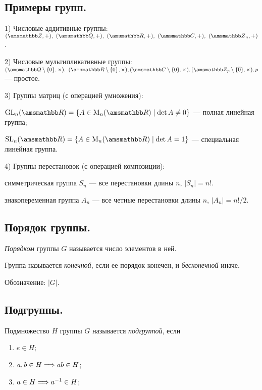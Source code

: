 \vspace{-0.2cm}
\subsection{Примеры групп.}
1) Числовые аддитивные группы:
  $(\ZZ, +), \ (\QQ, +), \ (\RR, +), \ (\CC, +), \ (\ZZ_n, +)$.

2) Числовые мультипликативные группы:
   $(\QQ \setminus \{0\}, \times), \ (\RR \setminus \{0\}, \times),
   (\CC \setminus \{0\}, \times),
   (\ZZ_p \setminus \{\overline{0}\}, \times), p$ --- простое.

3) Группы матриц (с операцией умножения):

$\GL_n(\RR) = \{A \in \M_n(\RR) \mid \det A \ne 0\}$ --- 
полная линейная группа;

$\SL_n(\RR) = \{A \in \M_n(\RR) \mid \det A = 1\}$ --- 
специальная линейная группа.

4) Группы перестановок (с операцией композиции):

симметрическая группа $S_n$ --- все перестановки длины $n$,
$|S_n| = n!$.

знакопеременная группа $A_n$ --- все четные перестановки длины $n$,
$|A_n| = n! /2$.

\vspace{-0.2cm}
\subsection{Порядок группы.}
\begin{definition}
  \textit{Порядком} группы $G$ называется число элементов в ней.
\end{definition}

Группа называется \textit{конечной}, если ее порядок конечен,
и \textit{бесконечной} иначе.

Обозначение: $|G|$.
\vspace{-0.2cm}
\subsection{Подгруппы.}
\begin{definition}
  Подмножество $H$ группы $G$ называется \textit{подгруппой},
  если
  \vspace{-0.2cm}
  \begin{enumerate}[label=\arabic*)]
    \item $e \in H$;
    \item $a, b \in H \Longrightarrow ab \in H$;
    \item $a \in H \Longrightarrow a^{-1} \in H$;
  \end{enumerate}
\end{definition}

